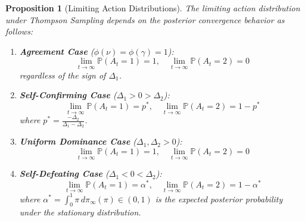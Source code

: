 \documentclass[12pt]{article}
\newtheorem{proposition}{Proposition}
\begin{document}
\begin{proposition}[Limiting Action Distributions]
\label{prop:limiting_action_distributions}
The limiting action distribution under Thompson Sampling depends on the posterior convergence behavior as follows:

\begin{enumerate}
    \item[(i)] \textbf{Agreement Case} ($\phi(\nu) = \phi(\gamma) = 1$): 
    \[\lim_{t \to \infty} \mathbb{P}(A_t = 1) = 1, \quad \lim_{t \to \infty} \mathbb{P}(A_t = 2) = 0\]
    regardless of the sign of $\Delta_1$.

    \item[(ii)] \textbf{Self-Confirming Case} ($\Delta_1 > 0 > \Delta_2$):
    \[\lim_{t \to \infty} \mathbb{P}(A_t = 1) = p^*, \quad \lim_{t \to \infty} \mathbb{P}(A_t = 2) = 1 - p^*\]
    where $p^* = \frac{-\Delta_2}{\Delta_1 - \Delta_2}$.

    \item[(iii)] \textbf{Uniform Dominance Case} ($\Delta_1, \Delta_2 > 0$):
    \[\lim_{t \to \infty} \mathbb{P}(A_t = 1) = 1, \quad \lim_{t \to \infty} \mathbb{P}(A_t = 2) = 0\]

    \item[(iv)] \textbf{Self-Defeating Case} ($\Delta_1 < 0 < \Delta_2$):
    \[\lim_{t \to \infty} \mathbb{P}(A_t = 1) = \alpha^*, \quad \lim_{t \to \infty} \mathbb{P}(A_t = 2) = 1 - \alpha^*\]
    where $\alpha^* = \int_0^1 \pi \, d\pi_{\infty}(\pi) \in (0,1)$ is the expected posterior probability under the stationary distribution.
\end{enumerate}
\end{proposition}
\end{document}
